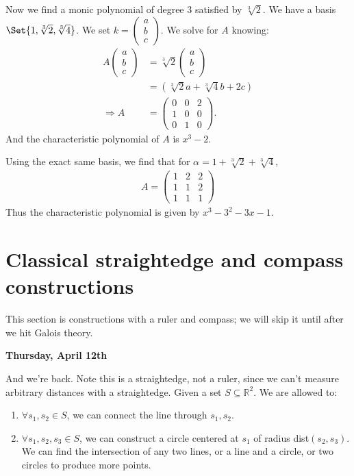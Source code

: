 \documentclass[9pt,reqno,twoside]{amsbook}
\theoremstyle{plain}
\numberwithin{section}{chapter}
\numberwithin{equation}{chapter}
\theoremstyle{definition}
\theoremstyle{remark}
\theoremstyle{plain}
\newcommand{\sub}{\subseteq}
\newcommand{\R}{\mathbb{R}}
\renewcommand{\c}{\mathbb{C}}
\newcommand{\bee}{\begin{equation}\begin{aligned}}
\newcommand{\eee}{\end{aligned}\end{equation}}
\newcommand{\lpar}{\left(}
\newcommand{\rpar}{\right)}
\begin{document}
\begin{enumerate}[label=\arabic*.]
Now we find a monic polynomial of degree 3 satisfied by $\sqrt[3]{2}$. We have a basis $\Set{1,\sqrt[3]{2},\sqrt[3]{4}}$. We set $k = \lpar 
\begin{matrix}
a\\b\\c
\end{matrix} \rpar$. We solve for $A$ knowing:
\bee
A\lpar 
\begin{matrix}
a\\b\\c
\end{matrix} \rpar &= \sqrt[3]{2}\lpar 
\begin{matrix}
a\\b\\c
\end{matrix} \rpar\\
&= (\sqrt[3]{2}a + \sqrt[3]{4}b + 2c)\\
\Rightarrow A &= \lpar 
\begin{matrix}
0 & 0 & 2\\
1 & 0 & 0\\
0 & 1 & 0
\end{matrix} \rpar.
\eee
And the characteristic polynomial of $A$ is $x^3 - 2$. 


Using the exact same basis, we find that for $\alpha = 1 + \sqrt[3]{2} + \sqrt[3]{4}$, 
\bee
A = \lpar 
\begin{matrix}
1 & 2 & 2\\
1 & 1 & 2\\
1 & 1 & 1
\end{matrix} \rpar
\eee
Thus the characteristic polynomial is given by $x^3 - 3^2 - 3x - 1$. 





\end{enumerate}

\section{Classical straightedge and compass constructions}

This section is constructions with a ruler and compass; we will skip it until after we hit Galois theory. 

\textbf{Thursday, April 12th}

And we're back. Note this is a straightedge, not a ruler, since we can't measure arbitrary distances with a straightedge. Given a set $S \sub \R^2$. We are allowed to:
\begin{enumerate}
\item $\forall s_1,s_2 \in S$, we can connect the line through $s_1,s_2$. 
\item $\forall s_1,s_2,s_3 \in S$, we can construct a circle centered at $s_1$ of radius dist$(s_2,s_3)$. We can find the intersection of any two lines, or a line and a circle, or two circles to produce more points. 
\end{enumerate}
\end{document}
